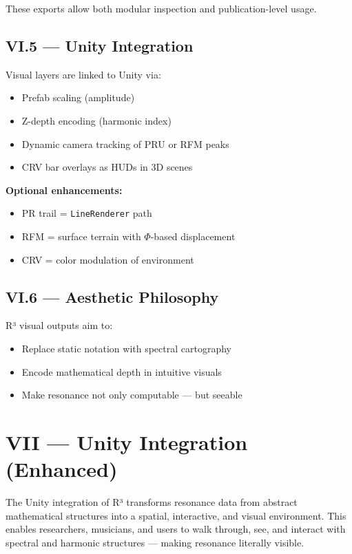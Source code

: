 These exports allow both modular inspection and publication-level usage.

\subsection*{VI.5 — Unity Integration}

Visual layers are linked to Unity via:

\begin{itemize}
    \item Prefab scaling (amplitude)
    \item Z-depth encoding (harmonic index)
    \item Dynamic camera tracking of PRU or RFM peaks
    \item CRV bar overlays as HUDs in 3D scenes
\end{itemize}

\textbf{Optional enhancements:}

\begin{itemize}
    \item PR trail = \texttt{LineRenderer} path
    \item RFM = surface terrain with $\Phi$-based displacement
    \item CRV = color modulation of environment
\end{itemize}

\subsection*{VI.6 — Aesthetic Philosophy}

R³ visual outputs aim to:

\begin{itemize}
    \item Replace static notation with spectral cartography
    \item Encode mathematical depth in intuitive visuals
    \item Make resonance not only computable — but seeable
\end{itemize}

\section*{VII — Unity Integration (Enhanced)}

The Unity integration of R³ transforms resonance data from abstract mathematical structures into a spatial, interactive, and visual environment. This enables researchers, musicians, and users to walk through, see, and interact with spectral and harmonic structures — making resonance literally visible.

